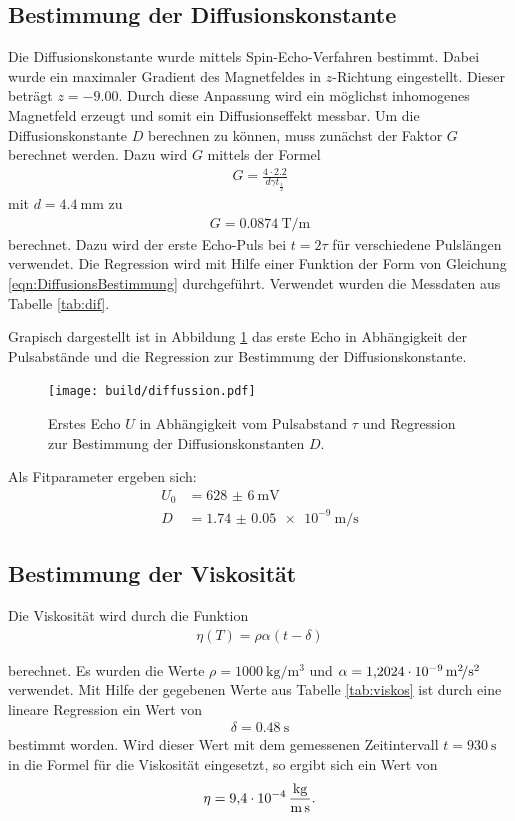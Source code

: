 \subsection{Bestimmung der Diffusionskonstante}
Die Diffusionskonstante wurde mittels Spin-Echo-Verfahren bestimmt. Dabei wurde
ein maximaler Gradient des Magnetfeldes in $z$-Richtung eingestellt. Dieser beträgt
$z = -\num{9.00}$. Durch diese Anpassung wird ein möglichst inhomogenes Magnetfeld
erzeugt und somit ein Diffusionseffekt messbar.
Um die Diffusionskonstante $D$ berechnen zu können, muss zunächst der Faktor
$G$ berechnet werden. Dazu wird $G$ mittels der Formel
\begin{align*}
  G = \frac{4\cdot 2.2}{d \gamma t_\frac{1}{2}}
\end{align*}
mit $d = \SI{4.4}{\milli\meter}$ zu
\begin{align*}
  G = \SI{0.0874}{\tesla\per\meter}
\end{align*}
berechnet.
Dazu wird der erste Echo-Puls bei $t = 2\tau$ für verschiedene Pulslängen
verwendet. Die Regression wird mit Hilfe
einer Funktion der Form von Gleichung \eqref{eqn:DiffusionsBestimmung} durchgeführt. Verwendet wurden die
Messdaten aus Tabelle \ref{tab:dif}.

Grapisch dargestellt ist in Abbildung
\ref{plt:diff} das erste Echo in Abhängigkeit der Pulsabstände und die Regression
zur Bestimmung der Diffusionskonstante.
\begin{figure}[htb]
  \centering
  \texttt{[image: build/diffussion.pdf]}
  \caption{Erstes Echo $U$ in Abhängigkeit vom Pulsabstand $\tau$ und Regression
  zur Bestimmung der Diffusionskonstanten $D$.}
  \label{plt:diff}
\end{figure}
Als Fitparameter ergeben sich:
\begin{align*}
  U_0 &= \SI{628(6)}{\milli\volt} \\
  D &= \SI{1.74(5)e-9}{\meter\per\second}
\end{align*}

\subsection{Bestimmung der Viskosität}
Die Viskosität wird durch die Funktion
\begin{align*}
  \eta(T) = \rho \alpha \left(t - \delta\right)
\end{align*}

berechnet. Es wurden die Werte $\rho = \SI{1000}{\kilo\gram\per\cubic\meter}$
und $\alpha = \SI{1.2024d-9}{\square\meter\per\square\second}$ verwendet. Mit
Hilfe der gegebenen Werte aus Tabelle \ref{tab:viskos} ist durch eine lineare
Regression ein Wert von
\begin{align*}
  \delta = \SI{0.48}{\second}
\end{align*}
bestimmt worden. Wird dieser Wert mit dem gemessenen Zeitintervall
$t = \SI{930}{\second}$ in die Formel für die Viskosität eingesetzt,
so ergibt sich ein Wert von
\begin{align*}
  \eta = \SI{9.4d-4}{\kilo\gram\per\meter\per\second}.
\end{align*}

